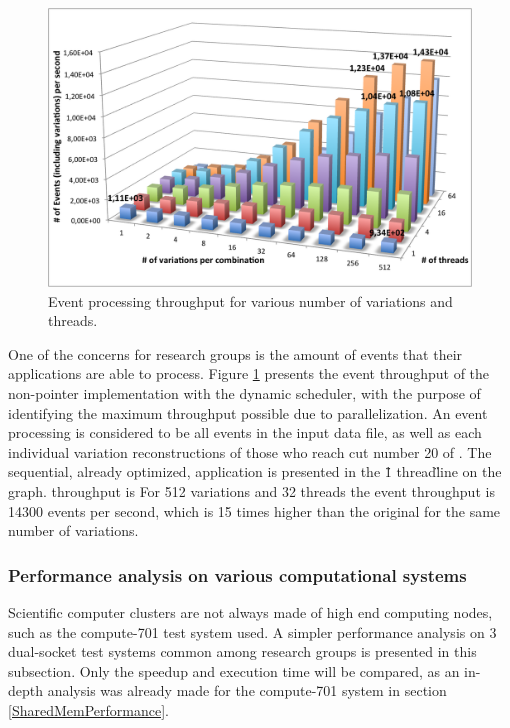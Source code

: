 \begin{figure}[!htp]
	\begin{center}
		\includegraphics[scale=0.6]{../../common/graphs/throughput.png}
		\caption{Event processing throughput for various number of variations and threads.}
		\label{fig:EventThroughput}
	\end{center}
\end{figure}

One of the concerns for research groups is the amount of events that their applications are able to process. Figure \ref{fig:EventThroughput} presents the event throughput of the non-pointer implementation with the dynamic scheduler, with the purpose of identifying the maximum throughput possible due to parallelization. An event processing is considered to be all events in the input data file, as well as each individual variation reconstructions of those who reach cut number 20 of \tth. The sequential, already optimized, application is presented in the \"1 thread\" line on the graph. throughput is For 512 variations and 32 threads the event throughput is 14300 events per second, which is 15 times higher than the original for the same number of variations.


\subsubsection{Performance analysis on various computational systems}
\label{SharedMemPerformanceVarious}

Scientific computer clusters are not always made of high end computing nodes, such as the compute-701 test system used. A simpler performance analysis on 3 dual-socket test systems common among research groups is presented in this subsection. Only the speedup and execution time will be compared, as an in-depth analysis was already made for the compute-701 system in section \ref{SharedMemPerformance}.

